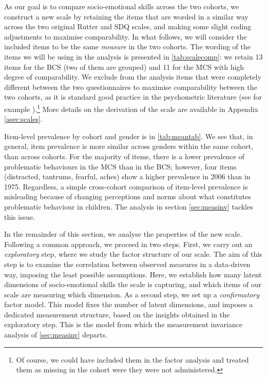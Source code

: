 As our goal is to compare socio-emotional skills across the two cohorts, we construct a new scale by retaining the items that are worded in a similar way across the two original Rutter and SDQ scales, and making some slight coding adjustments to maximise comparability. In what follows, we will consider the included items to be the same \emph{measure} in the two cohorts. The wording of the items we will be using in the analysis is presented in \autoref{tab:scalecomp}: we retain 13 items for the BCS (two of them are grouped) and 11 for the MCS with high degree of comparability. We exclude from the analysis items that were completely different between the two questionnaires to maximise comparability between the two cohorts, as it is standard good practice in the psychometric literature (see for example \citet{Kern2014}).\footnote{Of course, we could have included them in the factor analysis and treated them as missing in the cohort were they were not administered.} More details on the derivation of the scale are available in Appendix \autoref{asec:scales}.

Item-level prevalence by cohort and gender is in \autoref{tab:meantab}. We see that, in general, item prevalence is more similar across genders within the same cohort, than across cohorts. For the majority of items, there is a lower prevalence of problematic behaviours in the MCS than in the BCS; however, four items (distracted, tantrums, fearful, aches) show a higher prevalence in 2006 than in 1975. Regardless, a simple cross-cohort comparison of item-level prevalence is misleading because of changing perceptions and norms about what constitutes problematic behaviour in children. The analysis in section \ref{sec:measinv} tackles this issue.

In the remainder of this section, we analyse the properties of the new scale. Following a common approach, we proceed in two steps. First, we carry out an \emph{exploratory} step, where we study the factor structure of our scale. The aim of this step is to examine the correlation between observed measures in a data-driven way, imposing the least possible assumptions. Here, we establish how many latent dimensions of socio-emotional skills the scale is capturing, and which items of our scale are measuring which dimension. As a second step, we set up a \emph{confirmatory} factor model. This model fixes the number of latent dimensions, and imposes a dedicated measurement structure, based on the insights obtained in the exploratory step. This is the model from which the measurement invariance analysis of \autoref{sec:measinv} departs.

